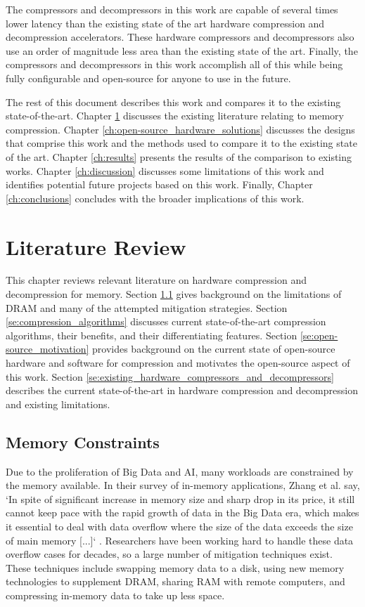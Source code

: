 \documentclass[doublespace,nopageskip]{VTthesis}
\begin{document}
The compressors and decompressors in this work are capable of several times lower latency than the existing state of the art hardware compression and decompression accelerators. These hardware compressors and decompressors also use an order of magnitude less area than the existing state of the art. Finally, the compressors and decompressors in this work accomplish all of this while being fully configurable and open-source for anyone to use in the future. 

The rest of this document describes this work and compares it to the existing state-of-the-art. Chapter \ref{ch:literature_review} discusses the existing literature relating to memory compression. Chapter \ref{ch:open-source_hardware_solutions} discusses the designs that comprise this work and the methods used to compare it to the existing state of the art. Chapter \ref{ch:results} presents the results of the comparison to existing works. Chapter \ref{ch:discussion} discusses some limitations of this work and identifies potential future projects based on this work. Finally, Chapter \ref{ch:conclusions} concludes with the broader implications of this work.

\chapter{Literature Review} \label{ch:literature_review}
This chapter reviews relevant literature on hardware compression and decompression for memory. Section \ref{se:memory_constraints} gives background on the limitations of DRAM and many of the attempted mitigation strategies. Section \ref{se:compression_algorithms} discusses current state-of-the-art compression algorithms, their benefits, and their differentiating features. Section \ref{se:open-source_motivation} provides background on the current state of open-source hardware and software for compression and motivates the open-source aspect of this work. Section \ref{se:existing_hardware_compressors_and_decompressors} describes the current state-of-the-art in hardware compression and decompression and existing limitations.

\section{Memory Constraints}\label{se:memory_constraints}
Due to the proliferation of Big Data and AI, many workloads are constrained by the memory available. In their survey of in-memory applications, Zhang et al. say, `In spite of significant increase in memory size and sharp drop in its price, it still cannot keep pace with the rapid growth of data in the Big Data era, which makes it essential to deal with data overflow where the size of the data exceeds the size of main memory [...]` \cite{inmemorybigdata}. Researchers have been working hard to handle these data overflow cases for decades, so a large number of mitigation techniques exist. These techniques include swapping memory data to a disk, using new memory technologies to supplement DRAM, sharing RAM with remote computers, and compressing in-memory data to take up less space.
\end{document}

